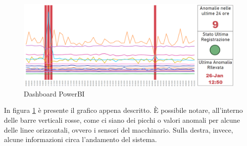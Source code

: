 \begin{figure}[t]
	\centering
	\includegraphics[width=14cm, scale=1]{images/powerbi}
	\caption{Dashboard PowerBI}
	\label{powerbi}
\end{figure}

In figura \ref{powerbi} è presente il grafico appena descritto. È possibile notare, all'interno delle barre verticali rosse, come ci siano dei picchi o valori anomali per alcune delle linee orizzontali, ovvero i sensori del macchinario. Sulla destra, invece, alcune informazioni circa l'andamento del sistema. 